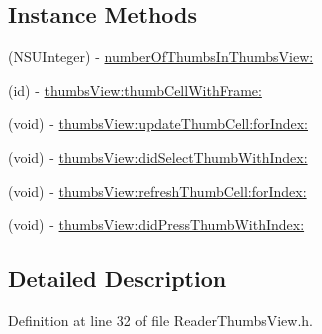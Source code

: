 \subsection*{Instance Methods}
\begin{DoxyCompactItemize}
\item 
(N\-S\-U\-Integer) -\/ \hyperlink{protocol_reader_thumbs_view_delegate-p_a7994669387eb329edb3aad761710786f}{number\-Of\-Thumbs\-In\-Thumbs\-View\-:}
\item 
(id) -\/ \hyperlink{protocol_reader_thumbs_view_delegate-p_a2f8cd902ac375053c12c2c2745d6296e}{thumbs\-View\-:thumb\-Cell\-With\-Frame\-:}
\item 
(void) -\/ \hyperlink{protocol_reader_thumbs_view_delegate-p_a0e775cbe6eac2c4f29090ef56087a626}{thumbs\-View\-:update\-Thumb\-Cell\-:for\-Index\-:}
\item 
(void) -\/ \hyperlink{protocol_reader_thumbs_view_delegate-p_a664c8fd8faf6f277cbcb3287aeecf26f}{thumbs\-View\-:did\-Select\-Thumb\-With\-Index\-:}
\item 
(void) -\/ \hyperlink{protocol_reader_thumbs_view_delegate-p_a358c8c70944eedb2986383076b98ca94}{thumbs\-View\-:refresh\-Thumb\-Cell\-:for\-Index\-:}
\item 
(void) -\/ \hyperlink{protocol_reader_thumbs_view_delegate-p_a958b9247665abef986a150f1320b7048}{thumbs\-View\-:did\-Press\-Thumb\-With\-Index\-:}
\end{DoxyCompactItemize}


\subsection{Detailed Description}


Definition at line 32 of file Reader\-Thumbs\-View.\-h.



